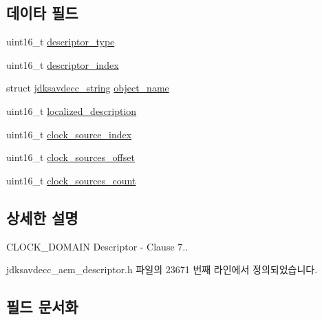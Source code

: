 \subsection*{데이타 필드}
\begin{DoxyCompactItemize}
\item 
uint16\+\_\+t \hyperlink{structjdksavdecc__descriptor__clock__domain_ab7c32b6c7131c13d4ea3b7ee2f09b78d}{descriptor\+\_\+type}
\item 
uint16\+\_\+t \hyperlink{structjdksavdecc__descriptor__clock__domain_a042bbc76d835b82d27c1932431ee38d4}{descriptor\+\_\+index}
\item 
struct \hyperlink{structjdksavdecc__string}{jdksavdecc\+\_\+string} \hyperlink{structjdksavdecc__descriptor__clock__domain_a7d1f5945a13863b1762fc6db74fa8f80}{object\+\_\+name}
\item 
uint16\+\_\+t \hyperlink{structjdksavdecc__descriptor__clock__domain_a0926f846ca65a83ad5bb06b4aff8f408}{localized\+\_\+description}
\item 
uint16\+\_\+t \hyperlink{structjdksavdecc__descriptor__clock__domain_ae6d3717453951addecc331540f572e30}{clock\+\_\+source\+\_\+index}
\item 
uint16\+\_\+t \hyperlink{structjdksavdecc__descriptor__clock__domain_a1f5c318297b1398ad46408ad6308245d}{clock\+\_\+sources\+\_\+offset}
\item 
uint16\+\_\+t \hyperlink{structjdksavdecc__descriptor__clock__domain_a7315787fca5771d39a38a39caa81a89e}{clock\+\_\+sources\+\_\+count}
\end{DoxyCompactItemize}


\subsection{상세한 설명}
C\+L\+O\+C\+K\+\_\+\+D\+O\+M\+A\+IN Descriptor -\/ Clause 7.. 

jdksavdecc\+\_\+aem\+\_\+descriptor.\+h 파일의 23671 번째 라인에서 정의되었습니다.



\subsection{필드 문서화}
